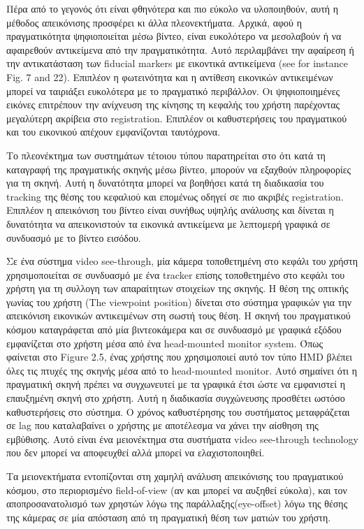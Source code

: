 Πέρα από το γεγονός ότι είναι φθηνότερα και πιο εύκολο να υλοποιηθούν, αυτή η μέθοδος απεικόνισης προσφέρει κι άλλα πλεονεκτήματα. Αρχικά, αφού η πραγματικότητα ψηφιοποιείται μέσω βίντεο, είναι ευκολότερο να μεσολαβούν ή να αφαιρεθούν αντικείμενα από την πραγματικότητα. Αυτό περιλαμβάνει την αφαίρεση ή την αντικατάσταση των fiducial markers με εικοντικά αντικείμενα (see for instance Fig. 7 and 22). Επιπλέον η φωτεινότητα και η αντίθεση εικονικών αντικειμένων μπορεί να ταιριάξει ευκολότερα με το πραγματικό περιβάλλον. Οι ψηφιοποιημένες εικόνες επιτρέπουν την ανίχνευση της κίνησης τη κεφαλής του χρήστη παρέχοντας μεγαλύτερη ακρίβεια στο registration. Επιπλέον οι καθυστερήσεις του πραγματικού και του εικονικού απέχουν εμφανίζονται ταυτόχρονα. \cite{krevelen2010}


Το πλεονέκτημα των συστημάτων τέτοιου τύπου παρατηρείται στο ότι κατά τη καταγραφή της πραγματικής σκηνής μέσω βίντεο, μπορούν να εξαχθούν πληροφορίες για τη σκηνή. Αυτή η δυνατότητα μπορεί να βοηθήσει κατά τη διαδικασία του tracking της θέσης του κεφαλιού και επομένως οδηγεί σε πιο ακριβές registration. Επιπλέον η απεικόνιση του βίντεο είναι συνήθως υψηλής ανάλυσης και δίνεται η δυνατότητα να απεικονιστούν τα εικονικά αντικείμενα με λεπτομερή γραφικά σε συνδυασμό με το βίντεο εισόδου.


Σε ένα σύστημα video see-through, μία κάμερα τοποθετημένη στο κεφάλι του χρήστη χρησιμοποιείται σε συνδυασμό με ένα tracker επίσης τοποθετημένο στο κεφάλι του χρήστη για τη συλλογη των απαραίτητων στοιχείων της σκηνής.
Η θέση της οπτικής γωνίας του χρήστη (The viewpoint position) δίνεται στο σύστημα γραφικών για την απεικόνιση εικονικών αντικειμένων στη σωστή τους θέση. Η σκηνή του πραγματικού κόσμου καταγράφεται από μία βιντεοκάμερα και σε συνδυασμό με γραφικά εξόδου εμφανίζεται στο χρήστη μέσα από ένα head-mounted monitor system. 
Όπως φαίνεται στο Figure 2.5, ένας χρήστης που χρησιμοποιεί αυτό τον τύπο HMD βλέπει όλες τις πτυχές της σκηνής μέσα από το head-mounted monitor. Αυτό σημαίνει ότι η πραγματική σκηνή πρέπει να συγχωνευτεί με τα γραφικά έτσι ώστε να εμφανιστεί η επαυξημένη σκηνή στο χρήστη. 
Αυτή η διαδικασία συγχώνευσης προσθέτει ωστόσο καθυστερήσεις στο σύστημα. Ο χρόνος καθυστέρησης του συστήματος μεταφράζεται σε lag που καταλαβαίνει ο χρήστης με αποτέλεσμα να χάνει την αίσθηση της εμβύθισης. Αυτό είναι ένα μειονέκτημα στα συστήματα video see-through technology που δεν μπορεί να αποφευχθεί αλλά μπορεί να ελαχιστοποιηθεί.

Τα μειονεκτήματα εντοπίζονται στη χαμηλή ανάλυση απεικόνισης του πραγματικού κόσμου, στο περιορισμένο field-of-view (αν και μπορεί να αυξηθεί εύκολα), και τον αποπροσανατολισμό των χρηστών λόγω της παράλλαξης(eye-offset) λόγω της θέσης της κάμερας σε μία απόσταση από τη πραγματική θέση των ματιών του χρήστη.




